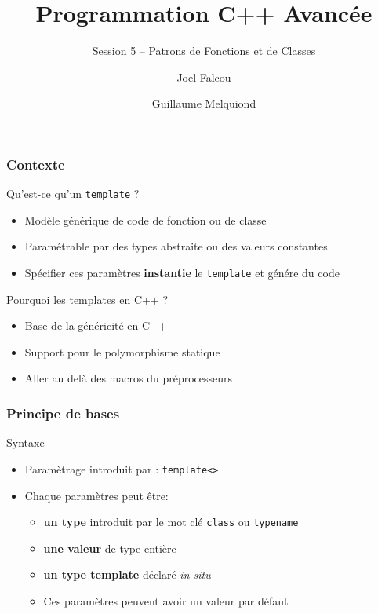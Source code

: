 \documentclass[svgnames]{beamer}
\title{Programmation C++ Avancée}
\subtitle{Session 5 -- Patrons de Fonctions et de Classes}
\author{Joel Falcou \and Guillaume Melquiond}
\institute{Laboratoire de Recherche en Informatique}
\date{}
\begin{document}



\begin{frame}[plain]
\titlepage
\end{frame}
\setcounter{framenumber}{0}
\frame
{
  \frametitle{Contexte}
  \begin{block}{Qu'est-ce qu'un \texttt{template} ?}
  \begin{itemize}
  \footnotesize
  \item Modèle générique de code de fonction ou de classe
  \item Paramétrable par des types abstraite ou des valeurs constantes
  \item Spécifier ces paramètres \textbf{instantie} le \texttt{template} et génére du code
  \end{itemize}
  \end{block}

  \begin{block}{Pourquoi les templates en C++ ?}
  \begin{itemize}
  \item Base de la généricité en C++
  \item Support pour le polymorphisme statique
  \item Aller au delà des macros du préprocesseurs
  \end{itemize}
  \end{block}
}
  
\frame
{
  \frametitle{Principe de bases}
  \begin{block}{Syntaxe}
  \begin{itemize}
  \item Paramètrage introduit par : \texttt{template<>}
  \item Chaque paramètres peut être:
  \begin{itemize}
  \item \textbf{un type} introduit par le mot clé \texttt{class} ou \texttt{typename}
  \lstparamtype
  \item \textbf{une valeur} de type entière
  \lstparaminteger
  \item \textbf{un type template} déclaré \textit{in situ}
  \lstparamtmp  
  \item Ces paramètres peuvent avoir un valeur par défaut
  \lstparamdefault
  \end{itemize}
  \end{itemize}
  \end{block}
}
\end{document}
